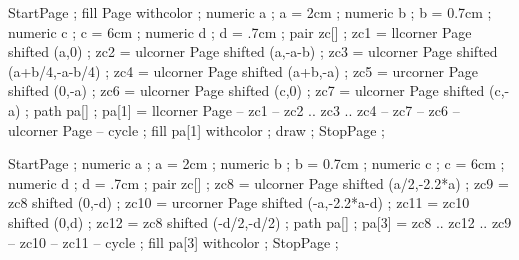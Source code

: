 
\Slidetitle{\page\setlayer[slidetitle]%
     {\framed[frame=off,width=\textwidth,height=2cm,offset=0pt,align=right,top=\vss,bottom=\vss]{\switchtobodyfont[\Titlesize]\color[d]{\bf #1}}}}







StartPage ;
fill Page withcolor  ;
numeric a ; a = 2cm ;
numeric b ; b = 0.7cm ;
numeric c ; c = 6cm ;
numeric d ; d = .7cm ;
pair zc[] ;
zc1 = llcorner Page shifted (a,0) ;
zc2 = ulcorner Page shifted (a,-a-b) ;
zc3 = ulcorner Page shifted (a+b/4,-a-b/4) ;
zc4 = ulcorner Page shifted (a+b,-a) ;
zc5 = urcorner Page shifted (0,-a) ;
zc6 = ulcorner Page shifted (c,0) ;
zc7 = ulcorner Page shifted (c,-a) ;
path pa[] ;
pa[1] = llcorner Page -- zc1 -- zc2 .. zc3 .. zc4 -- zc7 -- zc6 -- ulcorner Page -- cycle ;
fill pa[1] withcolor  ;
draw \sometxt{\framed[frame=off,width=2cm,height=2cm]{\color[a]{\pagenumber}}} ;
StopPage ;
\stopuseMPgraphic

StartPage ;
numeric a ; a = 2cm ;
numeric b ; b = 0.7cm ;
numeric c ; c = 6cm ;
numeric d ; d = .7cm ;
pair zc[] ;
zc8 = ulcorner Page shifted (a/2,-2.2*a) ;
zc9 = zc8 shifted (0,-d) ;
zc10 = urcorner Page shifted (-a,-2.2*a-d) ;
zc11 = zc10 shifted (0,d) ;
zc12 = zc8 shifted (-d/2,-d/2) ;
path pa[] ;
pa[3] = zc8 .. zc12 .. zc9 -- zc10 -- zc11 -- cycle ;
fill pa[3] withcolor  ;
StopPage ;
\stopuniqueMPgraphic

